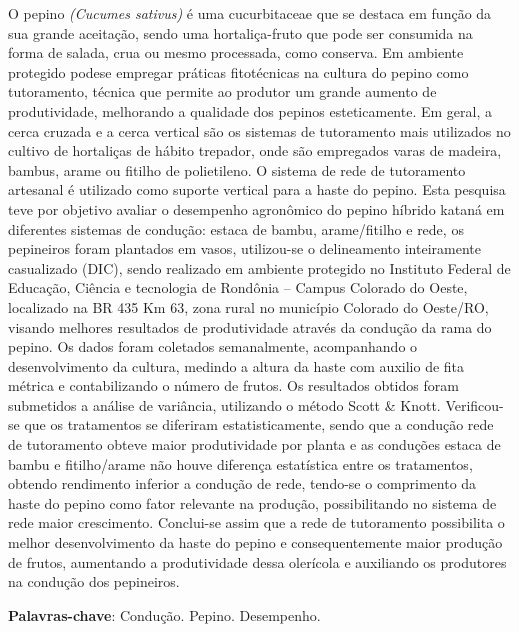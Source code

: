 \documentclass[article,12pt,onesidea,4paper,english,brazil]{abntex2}
\begin{document}
	\noindent
	 O pepino \textit{(Cucumes sativus)} é uma cucurbitaceae que se destaca em função da sua
	grande aceitação, sendo uma hortaliça-fruto que pode ser consumida na forma de
	salada, crua ou mesmo processada, como conserva. Em ambiente protegido podese
	empregar práticas fitotécnicas na cultura do pepino como tutoramento, técnica
	que permite ao produtor um grande aumento de produtividade, melhorando a
	qualidade dos pepinos esteticamente. Em geral, a cerca cruzada e a cerca vertical
	são os sistemas de tutoramento mais utilizados no cultivo de hortaliças de hábito
	trepador, onde são empregados varas de madeira, bambus, arame ou fitilho de
	polietileno. O sistema de rede de tutoramento artesanal é utilizado como suporte
	vertical para a haste do pepino. Esta pesquisa teve por objetivo avaliar o
	desempenho agronômico do pepino híbrido kataná em diferentes sistemas de
	condução: estaca de bambu, arame/fitilho e rede, os pepineiros foram plantados em
	vasos, utilizou-se o delineamento inteiramente casualizado (DIC), sendo realizado
	em ambiente protegido no Instituto Federal de Educação, Ciência e tecnologia de
	Rondônia – Campus Colorado do Oeste, localizado na BR 435 Km 63, zona rural no
	município Colorado do Oeste/RO, visando melhores resultados de produtividade
	através da condução da rama do pepino. Os dados foram coletados semanalmente,
	acompanhando o desenvolvimento da cultura, medindo a altura da haste com auxilio
	de fita métrica e contabilizando o número de frutos. Os resultados obtidos foram
	submetidos a análise de variância, utilizando o método Scott \& Knott. Verificou-se
	que os tratamentos se diferiram estatisticamente, sendo que a condução rede de
	tutoramento obteve maior produtividade por planta e as conduções estaca de bambu
	e fitilho/arame não houve diferença estatística entre os tratamentos, obtendo
	rendimento inferior a condução de rede, tendo-se o comprimento da haste do pepino
	como fator relevante na produção, possibilitando no sistema de rede maior
	crescimento. Conclui-se assim que a rede de tutoramento possibilita o melhor
	desenvolvimento da haste do pepino e consequentemente maior produção de frutos,
	aumentando a produtividade dessa olerícola e auxiliando os produtores na condução
	dos pepineiros.
	
	\vspace{\onelineskip}
	
	\noindent
	\textbf{Palavras-chave}: Condução. Pepino. Desempenho.
	
\end{document}

